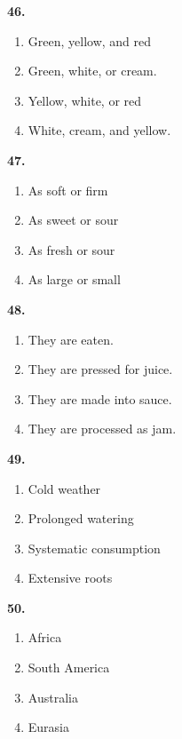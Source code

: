 \documentclass[12pt]{article}
\begin{document}
\vspace{0.25\baselineskip}
\noindent\textbf{46.}
\begin{enumerate}[label=(\Alph*),leftmargin=*,itemsep=0.2em]
\item Green, yellow, and red
\item Green, white, or cream.
\item Yellow, white, or red
\item White, cream, and yellow.
\end{enumerate}
\par
\vspace{0.25\baselineskip}
\noindent\textbf{47.}
\begin{enumerate}[label=(\Alph*),leftmargin=*,itemsep=0.2em]
\item As soft or firm
\item As sweet or sour
\item As fresh or sour
\item As large or small
\end{enumerate}
\par
\vspace{0.25\baselineskip}
\noindent\textbf{48.}
\begin{enumerate}[label=(\Alph*),leftmargin=*,itemsep=0.2em]
\item They are eaten.
\item They are pressed for juice.
\item They are made into sauce.
\item They are processed as jam.
\end{enumerate}
\par
\vspace{0.25\baselineskip}
\noindent\textbf{49.}
\begin{enumerate}[label=(\Alph*),leftmargin=*,itemsep=0.2em]
\item Cold weather
\item Prolonged watering
\item Systematic consumption
\item Extensive roots
\end{enumerate}
\par
\vspace{0.25\baselineskip}
\noindent\textbf{50.}
\begin{enumerate}[label=(\Alph*),leftmargin=*,itemsep=0.2em]
\item Africa
\item South America
\item Australia
\item Eurasia
\end{enumerate}
\par
\vspace{0.25\baselineskip}
\end{document}
